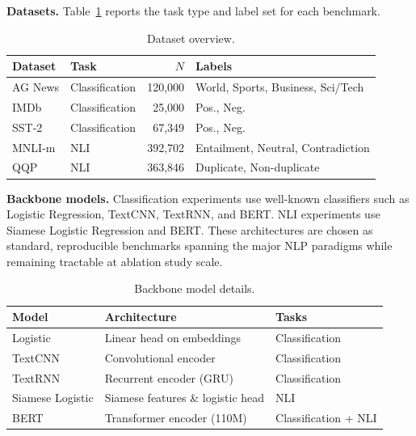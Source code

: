 \textbf{Datasets.}
Table~\ref{ch5:tab:datasets} reports the task type and label set for each benchmark.

\begin{table}[H]
    \caption{Dataset overview.}
    \label{ch5:tab:datasets}
    \centering
    \begin{tabular}{llrl}
        \toprule
        \textbf{Dataset} & \textbf{Task} & $N$ & \textbf{Labels} \\
        \midrule
        AG News   & Classification & 120,000 & World, Sports, Business, Sci/Tech \\
        IMDb      & Classification &  25,000 & Pos., Neg. \\
        SST-2     & Classification &  67,349 & Pos., Neg. \\
        MNLI-m    & NLI            & 392,702 & Entailment, Neutral, Contradiction \\
        QQP       & NLI            & 363,846 & Duplicate, Non-duplicate \\
        \bottomrule
    \end{tabular}
\end{table}

\textbf{Backbone models.}
Classification experiments use well-known classifiers such as Logistic Regression, TextCNN, TextRNN, and BERT.
NLI experiments use Siamese Logistic Regression and BERT.
These architectures are chosen as standard, reproducible benchmarks spanning the major NLP paradigms while remaining tractable at ablation study scale.

\begin{table}[H]
    \caption{Backbone model details.}
    \label{ch5:tab:backbones}
    \centering
    \begin{tabular}{lll}
        \toprule
        \textbf{Model}        & \textbf{Architecture}        & \textbf{Tasks} \\
        \midrule
        Logistic              & Linear head on embeddings    & Classification \\
        TextCNN               & Convolutional encoder        & Classification \\
        TextRNN               & Recurrent encoder (GRU)      & Classification \\
        Siamese Logistic      & Siamese features \& logistic head & NLI \\
        BERT & Transformer encoder (110M) & Classification + NLI \\
        \bottomrule
    \end{tabular}
\end{table}

